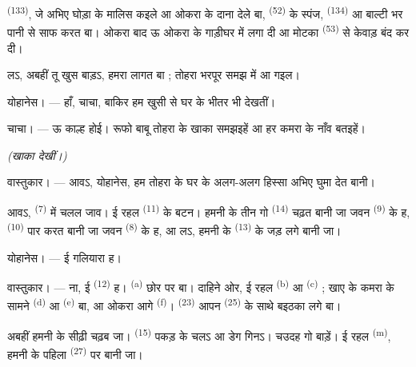  \textsuperscript{(133)}, जे अभिए घोड़ा के मालिस कइले आ
ओकरा के दाना देले बा,  \textsuperscript{(52)} के स्पंज,
 \textsuperscript{(134)} आ बाल्टी भर पानी से साफ करत बा।
ओकरा बाद ऊ ओकरा के गाड़ीघर में लगा दी आ मोटका 
\textsuperscript{(53)} से केवाड़ बंद कर दी।

लऽ, अबहीं तू खुस बाड़ऽ, हमरा लागत बा ; तोहरा भरपूर समझ में आ गइल।

\textsc{योहानेस}। --- हाँ, चाचा, बाकिर हम खुसी से घर के भीतर भी देखतीं।

\textsc{चाचा}। --- ऊ काल्ह होई। रूफो बाबू तोहरा के खाका समझइहें आ हर
कमरा के नाँव बतइहें।

\VUsaut{3.0mm}
\VUsaut{2.4mm}

{\centering\textit{(खाका देखीं।)}\par}
\VUsaut{2.4mm}

\textsc{वास्तुकार}। --- आवऽ, योहानेस, हम तोहरा के घर के अलग-अलग हिस्सा
अभिए घुमा देत बानी।

आवऽ,  \textsuperscript{(7)} में चलल जाव। ई रहल
 \textsuperscript{(11)} के बटन। हमनी के तीन गो 
\textsuperscript{(14)} चढ़त बानी जा जवन 
\textsuperscript{(9)} के ह,  \textsuperscript{(10)} पार
करत बानी जा जवन  \textsuperscript{(8)} के ह, आ लऽ, हमनी के 
\textsuperscript{(13)} के जड़ लगे बानी जा।

\textsc{योहानेस}। --- ई गलियारा ह।

\textsc{वास्तुकार}। --- ना, ई  \textsuperscript{(12)} ह।
 \textsuperscript{(a)} छोर पर बा। दाहिने ओर, ई रहल
 \textsuperscript{(b)} आ 
\textsuperscript{(c)} ; खाए के कमरा के सामने 
\textsuperscript{(d)} आ  \textsuperscript{(e)} बा, आ ओकरा
आगे  \textsuperscript{(f)}। 
\textsuperscript{(23)} आपन  \textsuperscript{(25)}
के साथे बइठका लगे बा।

अबहीं हमनी के सीढ़ी चढ़ब जा।  \textsuperscript{(15)} पकड़ के
चलऽ आ डेग गिनऽ। चउदह गो बाड़ें। ई रहल 
\textsuperscript{(m)}, हमनी के पहिला  \textsuperscript{(27)}
पर बानी जा।

\VUsaut{3.0mm}
\VUsaut{3.0mm}

